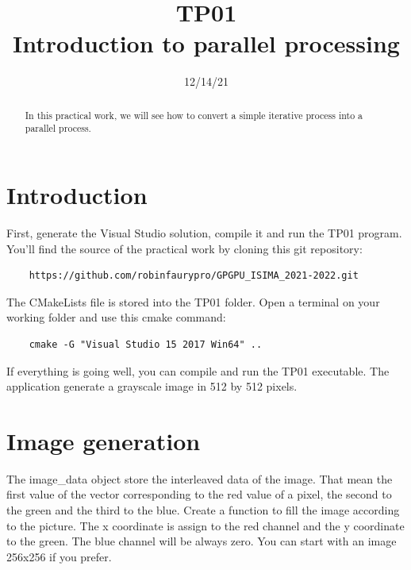 \documentclass{article}
\begin{document}
\title{TP01\\Introduction to parallel processing}
\date{12/14/21}
\maketitle

\begin{abstract}
	In this practical work, we will see how to convert a simple iterative process into a parallel process.
\end{abstract}


\section{Introduction}
First, generate the Visual Studio solution, compile it and run the TP01 program.
You'll find the source of the practical work by cloning this git repository:
\begin{lstlisting}
	https://github.com/robinfaurypro/GPGPU_ISIMA_2021-2022.git
\end{lstlisting}
The CMakeLists file is stored into the TP01 folder. Open a terminal on your working folder and use this cmake command:
\begin{lstlisting}
	cmake -G "Visual Studio 15 2017 Win64" ..
\end{lstlisting}
If everything is going well, you can compile and run the TP01 executable. The application generate a grayscale image in 512 by 512 pixels.

\section{Image generation}
The image\_data object store the interleaved data of the image. That mean the first value of the vector corresponding to the red value of a pixel, the second to the green and the third to the blue. Create a function to fill the image according to the picture. The x coordinate is assign to the red channel and the y coordinate to the green. The blue channel will be always zero. You can start with an image 256x256 if you prefer.
\end{document}
